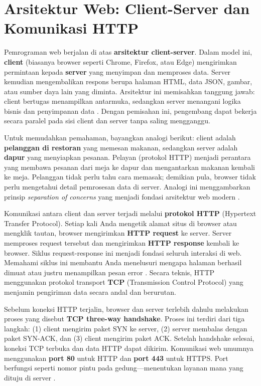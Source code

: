 \section{Arsitektur Web: Client-Server dan Komunikasi HTTP}
Pemrograman web berjalan di atas \textbf{arsitektur client-server}. Dalam model ini, \textbf{client} (biasanya browser seperti Chrome, Firefox, atau Edge) mengirimkan permintaan kepada \textbf{server} yang menyimpan dan memproses data. Server kemudian mengembalikan respons berupa halaman HTML, data JSON, gambar, atau sumber daya lain yang diminta. Arsitektur ini memisahkan tanggung jawab: client bertugas menampilkan antarmuka, sedangkan server menangani logika bisnis dan penyimpanan data \cite{mdnLearn}. Dengan pemisahan ini, pengembang dapat bekerja secara paralel pada sisi client dan server tanpa saling mengganggu.

Untuk memudahkan pemahaman, bayangkan analogi berikut: client adalah \textbf{pelanggan di restoran} yang memesan makanan, sedangkan server adalah \textbf{dapur} yang menyiapkan pesanan. Pelayan (protokol HTTP) menjadi perantara yang membawa pesanan dari meja ke dapur dan mengantarkan makanan kembali ke meja. Pelanggan tidak perlu tahu cara memasak; demikian pula, browser tidak perlu mengetahui detail pemrosesan data di server. Analogi ini menggambarkan prinsip \textit{separation of concerns} yang menjadi fondasi arsitektur web modern \cite{webdevLearn}.

Komunikasi antara client dan server terjadi melalui \textbf{protokol HTTP} (Hypertext Transfer Protocol). Setiap kali Anda mengetik alamat situs di browser atau mengklik tautan, browser mengirimkan \textbf{HTTP request} ke server. Server memproses request tersebut dan mengirimkan \textbf{HTTP response} kembali ke browser. Siklus request-response ini menjadi fondasi seluruh interaksi di web. Memahami siklus ini membantu Anda menelusuri mengapa halaman berhasil dimuat atau justru menampilkan pesan error \cite{webdevLearn}. Secara teknis, HTTP menggunakan protokol transport \textbf{TCP} (Transmission Control Protocol) yang menjamin pengiriman data secara andal dan berurutan.

Sebelum koneksi HTTP terjalin, browser dan server terlebih dahulu melakukan proses yang disebut \textbf{TCP three-way handshake}. Proses ini terdiri dari tiga langkah: (1) client mengirim paket SYN ke server, (2) server membalas dengan paket SYN-ACK, dan (3) client mengirim paket ACK. Setelah handshake selesai, koneksi TCP terbuka dan data HTTP dapat dikirim. Komunikasi web umumnya menggunakan \textbf{port 80} untuk HTTP dan \textbf{port 443} untuk HTTPS. Port berfungsi seperti nomor pintu pada gedung---menentukan layanan mana yang dituju di server \cite{mdnLearn}.

